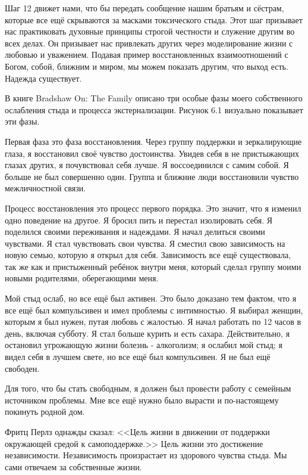 \documentclass[10pt, fleqn]{article}
\begin{document}
Шаг 12 движет нами, что бы передать сообщение нашим братьям и сёстрам, которые все ещё скрываются за масками токсического стыда. Этот шаг призывает нас практиковать духовные принципы строгой честности и служение другим во всех делах. Он призывает нас привлекать других через моделирование жизни с любовью и уважением. Подавая пример восстановленных взаимоотношений с Богом, собой, ближним и миром, мы можем показать другим, что выход есть. Надежда существует.


В книге Bradshaw On: The Family описано три особые фазы моего собственного ослабления стыда и процесса экстернализации. Рисунок 6.1 визуально показывает эти фазы.

Первая фаза это фаза восстановления. Через группу поддержки и зеркалирующие глаза, я восстановил своё чувство достоинства. Увидев себя в не пристыжающих глазах других, я почувствовал себя лучше. Я воссоединился с самим собой. Я больше не был совершенно один. Группа и ближние люди восстановили чувство межличностной связи.

Процесс восстановления это процесс первого порядка. Это значит, что я изменил одно поведение на другое. Я бросил пить и перестал изолировать себя. Я поделился своими переживания и надеждами. Я начал делиться своими чувствами. Я стал чувствовать свои чувства. Я сместил свою зависимость на новую семью, которую я открыл для себя. Зависимость все ещё существовала, так же как и пристыженный ребёнок внутри меня, который сделал группу моими новыми родителями, оберегающими меня.

Мой стыд ослаб, но все ещё был активен. Это было доказано тем фактом, что я все ещё был компульсивен и имел проблемы с интимностью. Я выбирал женщин, которым я был нужен, путая любовь с жалостью. Я начал работать по 12 часов в день, включая субботу. Я стал больше курить и есть сахара. Действительно, я остановил угрожающую жизни болезнь - алкоголизм; я ослабил мой стыд; я видел себя в лучшем свете, но все ещё был компульсивен. Я не был ещё свободен.

Для того, что бы стать свободным, я должен был провести работу с семейным источником проблемы. Мне все ещё нужно было вырасти и по-настоящему покинуть родной дом.

Фритц Перлз однажды сказал: <<Цель жизни в движении от поддержки окружающей средой к самоподдержке.>> Цель жизни это достижение независимости. Независимость произрастает из здорового чувства стыда. Мы сами отвечаем за собственные жизни.
\end{document}
